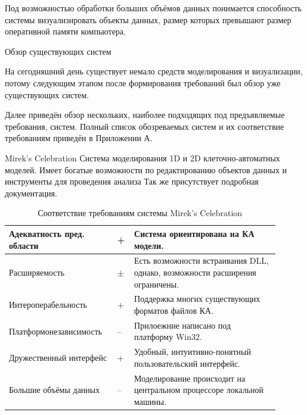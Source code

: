 \documentclass[a4paper,12pt]{extarticle}
\begin{document}
Под возможностью обработки больших объёмов данных понимается способность системы визуализировать объекты данных, размер которых превышают размер оперативной памяти компьютера.


\begin{section}{Обзор существующих систем}

На сегодняшний день существует немало средств моделирования и визуализации, потому следующим этапом после формирования требований был обзор уже существующих систем.

Далее приведён обзор нескольких, наиболее подходящих под предъявляемые требования, систем. Полный список обозреваемых систем и их соответствие требованиям приведён в Приложении А. 

\begin{subsection}{Mirek's Celebration}
    Система моделирования 1D и 2D клеточно-автоматных моделей. Имеет богатые возможности по редактированию объектов данных и инструменты для проведения анализа
    Так же присутствует подробная документация.

    \begin{table}[h]
        \caption{Соответствие требованиям системы Mirek's Celebration}
        \label{tabular:mirekscell}
        \begin{center}
            \begin{tabular}{|p{0.35\linewidth}|p{0.05\linewidth}|p{0.5\linewidth}|} \hline
                Адекватность пред. области & + & Система ориентирована на КА модели. \\ \hline
                Расширяемость              & $\pm$ & Есть возможности встраивания DLL, однако, возможности расширения ограничены. \\ \hline
                Интероперабельность        & + & Поддержка многих существующих форматов файлов КА.\\ \hline
                Платформонезависимость     & -- & Прилоежние написано под платформу Win32. \\ \hline
                Дружественный интерфейс    & + & Удобный, интуитивно-понятный пользовательский интерфейс. \\ \hline
                Большие объёмы данных      & -- & Моделирование происходит на центральном процессоре локальной машины. \\ \hline
            \end{tabular}
        \end{center}
    \end{table}
\end{subsection}


\end{section}
\end{document}
